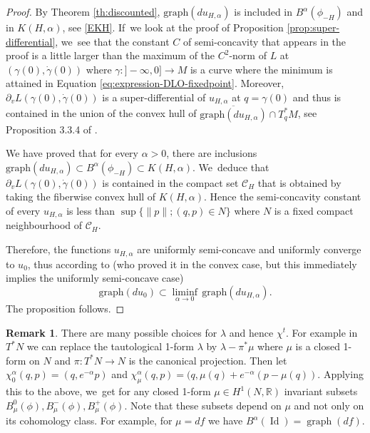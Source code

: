 \documentclass[10pt]{amsart}
\theoremstyle{definition}
\newtheorem{rem}[thm]{Remark}
\DeclareMathOperator{\Id}{Id}
\DeclareMathOperator{\gra}{graph}
\begin{document}
\begin{proof} By Theorem \ref{th:discounted}, $\mathrm{graph}(du_{H,\alpha})$ is included in $B^\alpha(\phi_{-H})$ and in $K(H,\alpha)$, see \eqref{EKH}. If~we look at the proof of Proposition \ref{prop:super-differential}, we~see that the constant $C$ of semi-concavity that appears in the proof is a little larger than the maximum of the $C^2$-norm of $L$
at $(\gamma(0),\dot\gamma(0))$ where $\gamma :{}]-\infty, 0]\to M$ is a curve where the minimum is attained in Equation \eqref{eq:expression-DLO-fixedpoint}. Moreover, $\partial_vL(\gamma(0), \dot\gamma(0))$ is
a super-differential of $u_{H, \alpha}$ at $q=\gamma(0)$ and thus is contained in the union of the convex hull of $\overline{\text{graph}(du_{H, \alpha})}\cap T_q^*M$, see Proposition 3.3.4 of \cite{CanSin04}.

We have proved that for every $\alpha>0$, there are inclusions $\text{graph}(du_{H, \alpha})\subset B^{\alpha}(\phi_{-H})\subset K(H,\alpha)$. We~deduce that $\partial_vL(\gamma(0), \dot\gamma(0))$ is contained in the compact set $\mathcal C_{H}$ that is obtained by taking the fiberwise convex hull of $K(H,\alpha)$. Hence the semi-concavity constant of every $u_{H, \alpha}$ is less than $\sup\{ \| p\|; (q, p)\in N\}$ where $N$ is a fixed compact neighbourhood of $\mathcal C_H$.

Therefore, the functions $u_{H,\alpha}$ are uniformly semi-concave and uniformly converge to $u_0$, thus according to \cite{Attouch} (who proved it in the convex case, but this immediately implies the uniformly semi-concave case)
\[
\mathrm{graph}(du_0)\subset \liminf_{\alpha\to 0}\,\mathrm{graph}(du_{H,\alpha}).
\]
The proposition follows.
\end{proof}

\begin{rem}
There are many possible choices for $\lambda$ and hence $\chi^t$. For example in $T^*N$ we can replace the tautological 1-form $\lambda$ by $\lambda-\pi^*\mu$ where $\mu$ is a closed 1-form on $N$ and $\pi:T^*N\to N$ is the canonical projection. Then let $\chi_0^\alpha(q,p)=(q,e^{-\alpha}p)$ and $\chi_\mu^\alpha(q,p)=(q,\mu(q)+e^{-\alpha}(p-\mu(q))$. Applying this to the above, we~get for any closed 1-form $\mu\in H^1(N, \mathbb R)$ invariant subsets $B_{\mu}^0(\phi), B_{\mu}^-(\phi), B_{\mu}^+(\phi)$.
Note that these subsets depend on $\mu$ and not only on its cohomology class. For example, for $\mu=df$ we have $B^\alpha(\Id)=\gra(df)$.
\end{rem}
\end{document}
